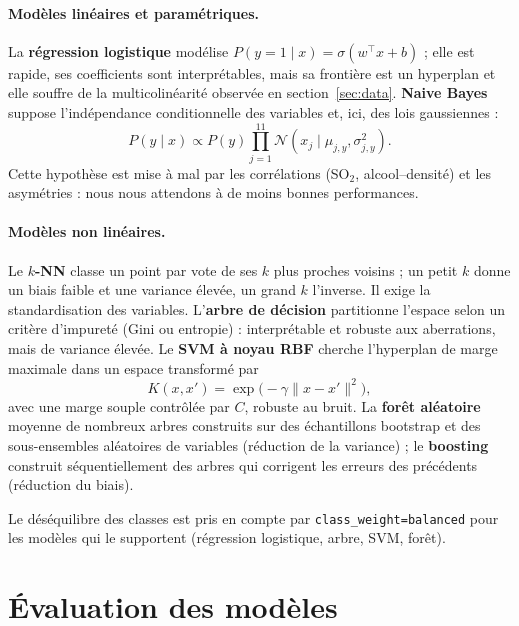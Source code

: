 \documentclass[11pt,a4paper]{article}
\begin{document}
\paragraph{Modèles linéaires et paramétriques.}
La \textbf{régression logistique} modélise $P(y=1\mid x) = \sigma(w^\top x + b)$ ; elle est rapide, ses coefficients sont interprétables, mais sa frontière est un hyperplan et
elle souffre de la multicolinéarité observée en section~\ref{sec:data}. \textbf{Naive Bayes} suppose l'indépendance conditionnelle des variables et, ici, des lois gaussiennes :
\begin{equation}
  P(y \mid x) \propto P(y) \prod_{j=1}^{11} \mathcal{N}(x_j \mid \mu_{j,y}, \sigma_{j,y}^2).
\end{equation}
Cette hypothèse est mise à mal par les corrélations (SO$_2$, alcool--densité) et les asymétries : nous nous attendons à de moins bonnes performances.

\paragraph{Modèles non linéaires.}
Le \textbf{$k$-NN} classe un point par vote de ses $k$ plus proches voisins ; un petit $k$ donne un biais faible et une variance élevée, un grand $k$ l'inverse. Il exige la standardisation
des variables. L'\textbf{arbre de décision} partitionne l'espace selon un critère d'impureté (Gini ou entropie) : interprétable et robuste aux aberrations, mais de variance élevée. Le \textbf{SVM à noyau RBF}
cherche l'hyperplan de marge maximale dans un espace transformé par
\begin{equation}
  K(x, x') = \exp\!\big(-\gamma \lVert x - x'\rVert^2\big),
\end{equation}
avec une marge souple contrôlée par $C$, robuste au bruit. La \textbf{forêt aléatoire}~\cite{breiman2001} moyenne de nombreux arbres construits sur des échantillons bootstrap et des sous-ensembles
aléatoires de variables (réduction de la variance) ; le \textbf{boosting} construit séquentiellement des arbres qui corrigent les erreurs des précédents (réduction du biais).

Le déséquilibre des classes est pris en compte par \texttt{class\_weight=balanced} pour les modèles qui le supportent (régression logistique, arbre, SVM, forêt).

\section{Évaluation des modèles}\label{sec:eval}
\end{document}
